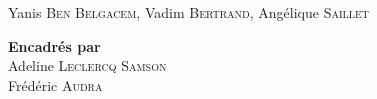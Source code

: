 \begin{titlepage}
\begin{center}
    	{\Large Yanis \textsc{Ben Belgacem}, Vadim \textsc{Bertrand}, Angélique \textsc{Saillet}}\\[1.5 cm]
    \end{center}

	\begin{center} \large
		    \textbf{Encadrés par}\\
			Adeline \textsc{Leclercq Samson}\\
			Frédéric \textsc{Audra}\\
	\end{center}
\end{titlepage}

\restoregeometry